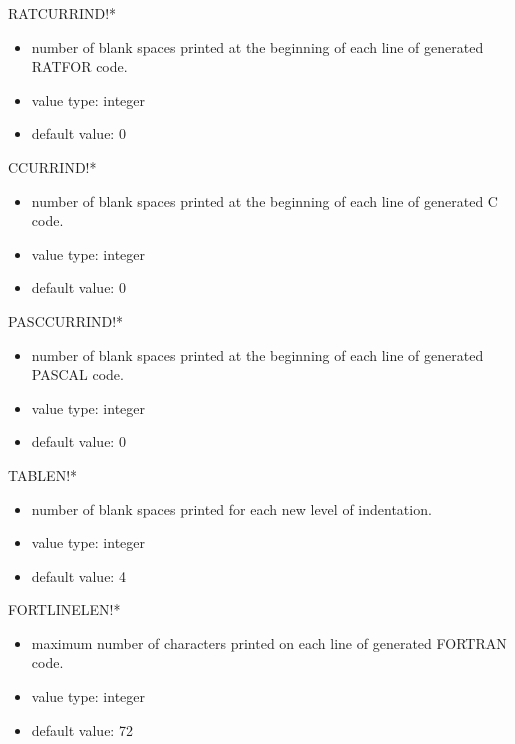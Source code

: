 \begin{describe}{RATCURRIND!*}
\begin{itemize}
\item number of blank spaces printed at the beginning of each line of
generated RATFOR code.
\item value type:  integer
\item default value:  0
\end{itemize}
\end{describe}

\begin{describe}{CCURRIND!*}
\begin{itemize}
\item number of blank spaces printed at the beginning of each line of
generated C code.
\item value type:  integer
\item default value:  0
\end{itemize}
\end{describe}

\begin{describe}{PASCCURRIND!*}
\begin{itemize}
\item number of blank spaces printed at the beginning of each line of
generated PASCAL code.
\item value type:  integer
\item default value:  0
\end{itemize}
\end{describe}

\begin{describe}{TABLEN!*}
\begin{itemize}
\item number of blank spaces printed for each new level of indentation.
\item value type:  integer
\item default value:  4
\end{itemize}
\end{describe}

\begin{describe}{FORTLINELEN!*}
\begin{itemize}
\item maximum number of characters printed on each line of generated FORTRAN
code.
\item value type:  integer
\item default value:  72
\end{itemize}
\end{describe}


